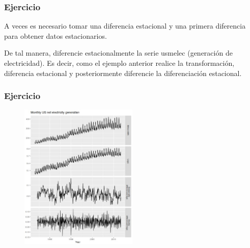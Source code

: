 \documentclass[10pt]{beamer}
\begin{document}



\begin{frame}[fragile]
\frametitle{Ejercicio}

A veces es necesario tomar una diferencia estacional y una primera diferencia para obtener datos estacionarios.

\vspace{4mm}

De tal manera, diferencie estacionalmente la serie usmelec (generación de electricidad). Es decir, como el ejemplo anterior realice la transformación, diferencia estacional y posteriormente diferencie la diferenciación estacional.



\end{frame}






\begin{frame}[fragile]
\frametitle{Ejercicio}



\begin{figure}
\begin{center}
    \includegraphics[width=0.5\textwidth]{Imagen8.JPG}
\end{center}
\end{figure}



\end{frame}




\end{document}
